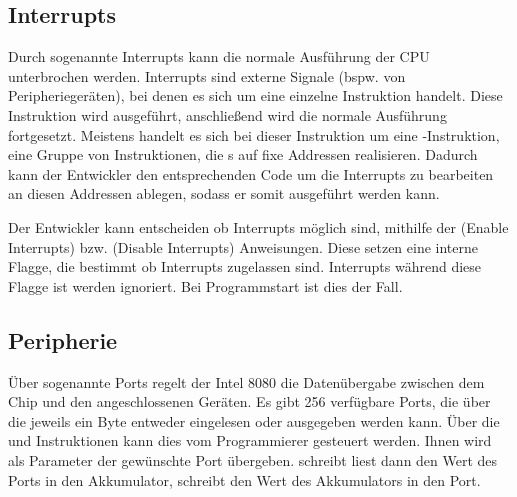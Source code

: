 \subsection{Interrupts}

Durch sogenannte Interrupts kann die normale Ausführung der CPU unterbrochen werden. Interrupts sind externe Signale (bspw. von Peripheriegeräten), bei denen es sich um eine einzelne Instruktion handelt. Diese Instruktion wird ausgeführt, anschließend wird die normale Ausführung fortgesetzt. Meistens handelt es sich bei dieser Instruktion um eine -Instruktion, eine Gruppe von Instruktionen, die s auf fixe Addressen realisieren. Dadurch kann der Entwickler den entsprechenden Code um die Interrupts zu bearbeiten an diesen Addressen ablegen, sodass er somit ausgeführt werden kann.

Der Entwickler kann entscheiden ob Interrupts möglich sind, mithilfe der  (Enable Interrupts) bzw.  (Disable Interrupts) Anweisungen. Diese setzen eine interne Flagge, die bestimmt ob Interrupts zugelassen sind. Interrupts während diese Flagge  ist werden ignoriert. Bei Programmstart ist dies der Fall.

\subsection{Peripherie}

Über sogenannte Ports regelt der Intel 8080 die Datenübergabe zwischen dem Chip und den angeschlossenen Geräten. 
Es gibt 256 verfügbare Ports, die über die jeweils ein Byte entweder eingelesen oder ausgegeben werden kann. Über die  und  Instruktionen kann dies vom Programmierer gesteuert werden. Ihnen wird als Parameter der gewünschte Port übergeben.  schreibt liest dann den Wert des Ports in den Akkumulator,  schreibt den Wert des Akkumulators in den Port.

